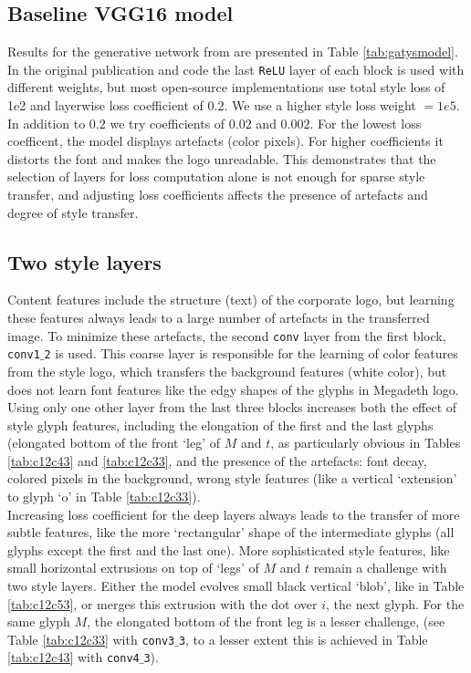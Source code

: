 \documentclass[a4paper,twoside]{article}
\begin{document}
\subsection{Baseline VGG16 model}
Results for the generative network from \cite{gatys2016image} are presented in Table \ref{tab:gatysmodel}. In the original publication and code the last \texttt{ReLU} layer of each block is used with different weights, but most open-source implementations use total style loss of 1e2 and layerwise loss coefficient of $0.2$. We use a higher style loss weight $=1e5$. In addition to $0.2$ we try coefficients of $0.02$ and $0.002$. For the lowest loss coefficent, the model displays artefacts (color pixels). For higher coefficients it distorts the font and makes the logo unreadable. This demonstrates that the selection of layers for loss computation alone is not enough for sparse style transfer, and adjusting loss coefficients affects the presence of artefacts and degree of style transfer. 
\subsection{Two style layers}
Content features include the structure (text) of the corporate logo, but learning these features always leads to a large number of artefacts in the transferred image. To minimize these artefacts, the second \texttt{conv} layer from the first block, \texttt{conv1${}\_{}$2} is used. This coarse layer is responsible for the learning of color features from the style logo, which transfers the background features (white color), but does not learn font features like the edgy shapes of the glyphs in Megadeth logo. Using only one other layer from the last three blocks increases both the effect of style glyph features, including the elongation of the first and the last glyphs (elongated bottom of the front `leg' of $M$ and $t$, as particularly obvious in Tables \ref{tab:c12c43} and \ref{tab:c12c33}, and the presence of the artefacts: font decay, colored pixels in the background, wrong style features (like a vertical `extension' to glyph `o' in Table \ref{tab:c12c33}). \\

\noindent Increasing loss coefficient for the deep layers always leads to the transfer of more subtle features, like the more `rectangular' shape of the intermediate glyphs (all glyphs except the first and the last one). More sophisticated style features, like small horizontal extrusions on top of `legs' of $M$ and $t$ remain a challenge with two style layers. Either the model evolves small black vertical `blob', like in Table \ref{tab:c12c53}, or merges this extrusion with the dot over $i$, the next glyph. For the same glyph $M$, the elongated bottom of the front leg is a lesser challenge, (see Table \ref{tab:c12c33} with \texttt{conv3${}\_{}$3}, to a lesser extent this is achieved in Table \ref{tab:c12c43} with \texttt{conv4${}\_{}$3}). \\
\end{document}

